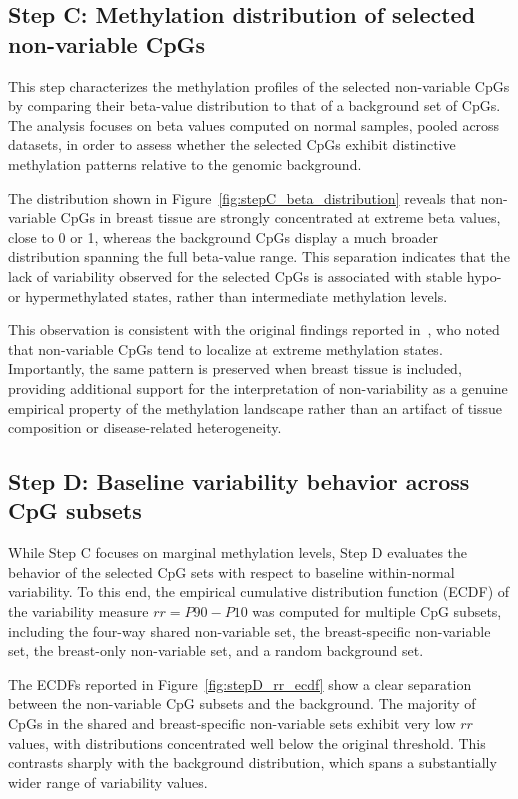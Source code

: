 \documentclass[10pt]{extarticle}
\begin{document}
\subsection{Step C: Methylation distribution of selected non-variable CpGs}

This step characterizes the methylation profiles of the selected non-variable CpGs by comparing their beta-value distribution to that of a background set of CpGs. The analysis focuses on beta values computed on normal samples, pooled across datasets, in order to assess whether the selected CpGs exhibit distinctive methylation patterns relative to the genomic background.

The distribution shown in Figure~\ref{fig:stepC_beta_distribution} reveals that non-variable CpGs in breast tissue are strongly concentrated at extreme beta values, close to 0 or 1, whereas the background CpGs display a much broader distribution spanning the full beta-value range. This separation indicates that the lack of variability observed for the selected CpGs is associated with stable hypo- or hypermethylated states, rather than intermediate methylation levels.

This observation is consistent with the original findings reported in~\cite{Edgar2017}, who noted that non-variable CpGs tend to localize at extreme methylation states. Importantly, the same pattern is preserved when breast tissue is included, providing additional support for the interpretation of non-variability as a genuine empirical property of the methylation landscape rather than an artifact of tissue composition or disease-related heterogeneity.

\subsection{Step D: Baseline variability behavior across CpG subsets}

While Step C focuses on marginal methylation levels, Step D evaluates the behavior of the selected CpG sets with respect to baseline within-normal variability. To this end, the empirical cumulative distribution function (ECDF) of the variability measure $rr = P90 - P10$ was computed for multiple CpG subsets, including the four-way shared non-variable set, the breast-specific non-variable set, the breast-only non-variable set, and a random background set.

The ECDFs reported in Figure~\ref{fig:stepD_rr_ecdf} show a clear separation between the non-variable CpG subsets and the background. The majority of CpGs in the shared and breast-specific non-variable sets exhibit very low $rr$ values, with distributions concentrated well below the original threshold. This contrasts sharply with the background distribution, which spans a substantially wider range of variability values.
\end{document}
